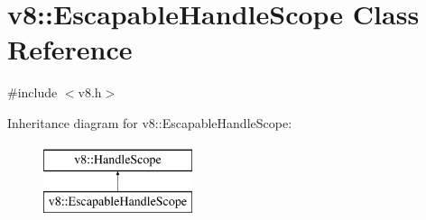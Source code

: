 \hypertarget{classv8_1_1EscapableHandleScope}{}\section{v8\+:\+:Escapable\+Handle\+Scope Class Reference}
\label{classv8_1_1EscapableHandleScope}


{\ttfamily \#include $<$v8.\+h$>$}

Inheritance diagram for v8\+:\+:Escapable\+Handle\+Scope\+:\begin{figure}[H]
\begin{center}
\leavevmode
\includegraphics[height=2.000000cm]{classv8_1_1EscapableHandleScope}
\end{center}
\end{figure}
